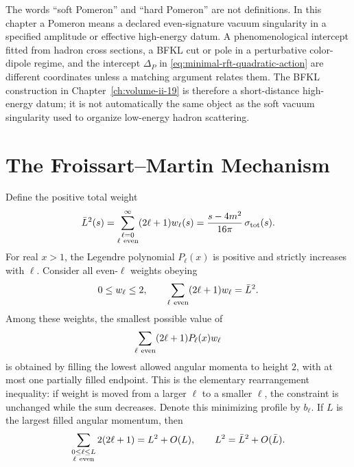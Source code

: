 \begin{remark}
\label{rem:soft-hard-pomeron-status}
The words ``soft Pomeron'' and ``hard Pomeron'' are not definitions.  In this
chapter a Pomeron means a declared even-signature vacuum singularity in a
specified amplitude or effective high-energy datum.  A phenomenological
intercept fitted from hadron cross sections, a BFKL cut or pole in a
perturbative color-dipole regime, and the intercept \(\Delta_P\) in
\eqref{eq:minimal-rft-quadratic-action} are different coordinates unless a
matching argument relates them.  The BFKL construction in
Chapter~\ref{ch:volume-ii-19} is therefore a
short-distance high-energy datum; it is not automatically the same object as
the soft vacuum singularity used to organize low-energy hadron scattering.
\end{remark}

\section{The Froissart--Martin Mechanism}

Define the positive total weight
\[
  \bar L^2(s)
  =
  \sum_{\substack{\ell=0\\ \ell\ {\rm even}}}^{\infty}
  (2\ell+1)w_\ell(s)
  =
  \frac{s-4m^2}{16\pi}\,\sigma_{\rm tot}(s).
\]
For real \(x>1\), the Legendre polynomial \(P_\ell(x)\) is positive and
strictly increases with \(\ell\).  Consider all even-\(\ell\) weights obeying
\[
  0\le w_\ell\le2,
  \qquad
  \sum_{\ell\ {\rm even}}(2\ell+1)w_\ell=\bar L^2 .
\]
Among these weights, the smallest possible value of
\[
  \sum_{\ell\ {\rm even}}(2\ell+1)P_\ell(x)w_\ell
\]
is obtained by filling the lowest allowed angular momenta to height \(2\),
with at most one partially filled endpoint.  This is the elementary
rearrangement inequality: if weight is moved from a larger \(\ell\) to a
smaller \(\ell\), the constraint is unchanged while the sum decreases.  Denote
this minimizing profile by \(b_\ell\).  If \(L\) is the largest filled angular
momentum, then
\[
  \sum_{\substack{0\le\ell\le L\\ \ell\ {\rm even}}}
  2(2\ell+1)
  =
  L^2+O(L),
  \qquad
  L^2=\bar L^2+O(\bar L).
\]

